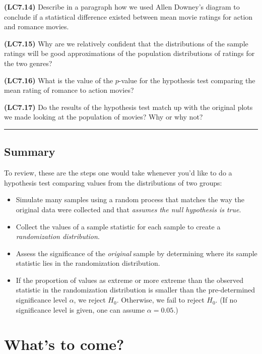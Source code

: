 \documentclass[]{tufte-book}
\begin{document}
\textbf{(LC7.14)} Describe in a paragraph how we used Allen Downey's
diagram to conclude if a statistical difference existed between mean
movie ratings for action and romance movies.

\textbf{(LC7.15)} Why are we relatively confident that the distributions
of the sample ratings will be good approximations of the population
distributions of ratings for the two genres?

\textbf{(LC7.16)} What is the value of the \(p\)-value for the
hypothesis test comparing the mean rating of romance to action movies?

\textbf{(LC7.17)} Do the results of the hypothesis test match up with
the original plots we made looking at the population of movies? Why or
why not?

\begin{center}\rule{\linewidth}{\linethickness}\end{center}

\subsection{Summary}\label{summary-5}

To review, these are the steps one would take whenever you'd like to do
a hypothesis test comparing values from the distributions of two groups:

\begin{itemize}
\item
  Simulate many samples using a random process that matches the way the
  original data were collected and that \emph{assumes the null
  hypothesis is true}.
\item
  Collect the values of a sample statistic for each sample to create a
  \emph{randomization distribution}.
\item
  Assess the significance of the \emph{original} sample by determining
  where its sample statistic lies in the randomization distribution.
\item
  If the proportion of values as extreme or more extreme than the
  observed statistic in the randomization distribution is smaller than
  the pre-determined significance level \(\alpha\), we reject \(H_0\).
  Otherwise, we fail to reject \(H_0\). (If no significance level is
  given, one can assume \(\alpha = 0.05\).)
\end{itemize}

\section{What's to come?}\label{whats-to-come-4}
\end{document}
